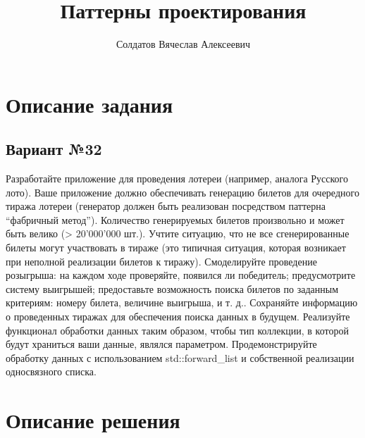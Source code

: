 \documentclass[a4paper,14pt]{article}
\author{Солдатов Вячеслав Алексеевич}
\title{Паттерны проектирования}
\date{}
\begin{document}
\maketitle
\setcounter{page}{2}
\tableofcontents
\clearpage
\clearpage


\section{Описание задания}
\subsection{Вариант №32}
Разработайте приложение для проведения лотереи (например, аналога
Русского лото). Ваше приложение должно обеспечивать генерацию билетов для
очередного тиража лотереи (генератор должен быть реализован посредством
паттерна “фабричный метод”). Количество генерируемых билетов произвольно и
может быть велико (> 20’000’000 шт.). Учтите ситуацию, что не все
сгенерированные билеты могут участвовать в тираже (это типичная ситуация,
которая возникает при неполной реализации билетов к тиражу). Смоделируйте
проведение розыгрыша: на каждом ходе проверяйте, появился ли победитель;
предусмотрите систему выигрышей; предоставьте возможность поиска билетов
по заданным критериям: номеру билета, величине выигрыша, и т. д.. Сохраняйте
информацию о проведенных тиражах для обеспечения поиска данных в
будущем. Реализуйте функционал обработки данных таким образом, чтобы тип
коллекции, в которой будут храниться ваши данные, являлся параметром.
Продемонстрируйте обработку данных с использованием std::forward\_list и
собственной реализации односвязного списка.
\clearpage

\section{Описание решения}
\end{document}
